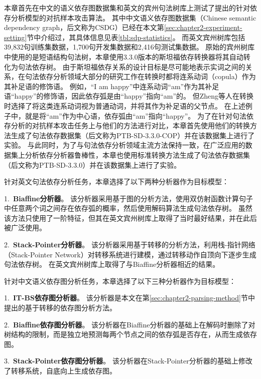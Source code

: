 本章首先在中文的语义依存图数据集和英文的宾州句法树库\cite{marcus-etal-1993-building}上测试了提出的针对依存分析模型的对抗样本攻击算法。
其中中文语义依存图数据集（Chinese semantic dependency graph，后文称为CSDG）已经在本文第\ref{sec:chapter2-experiment-setting}节中介绍过，其具体信息见表\ref{tbl:sdp-statistics}。
而英文宾州树库包括39,832句训练集数据，1,700句开发集数据和2,416句测试集数据。
原始的宾州树库中使用的是短语结构句法树，本章使用3.3.0版本的斯坦福依存转换器\cite{de-etal-2006-generating}将其自动转化为句法依存树。
由于斯坦福依存关系的设计目标是尽可能地表示实词之间的关系，在句法依存分析领域大部分的研究工作在转换时都将连系动词（copula）作为其补足语的修饰语。
例如，“I am happy”中连系动词“am”作为其补足语“happy”的修饰语，因此依存弧是由“happy”指向“am”的。
但Zheng等人\cite{zheng-etal-2020-evaluating}在转换时选择了将这类连系动词视为普通动词，并将其作为补足语的父节点。
在上述例子中，就是将“am”作为中心语，依存弧由“am”指向“happy”。
为了在针对句法依存分析的对抗样本攻击任务上与他们的方法进行对比，本章首先使用他们的转换方法生成了句法依存数据集（后文称为PTB-SD-3.3.0-COP）并在该数据集上进行了实验。
与此同时，为了与句法依存分析领域主流方法保持一致，在广泛应用的数据集上分析依存分析器鲁棒性，本章也使用标准转换方法生成了句法依存数据集（后文称为PTB-SD-3.3.0）并在该数据集上进行了实验。

针对英文句法依存分析任务，本章选择了以下两种分析器作为目标模型：

1.\ \textbf{Biaffine分析器}\cite{dozat-etal-2017-deep}。
该分析器采用基于图的分析方法，使用双仿射函数计算句子中任意两个词之间存在依存弧的概率，然后使用解码算法生成句法依存树。
虽然该方法只使用了一阶特征，但其在英文宾州树库上取得了当时最好结果，并在此后被广泛使用。

2.\ \textbf{Stack-Pointer分析器}\cite{ma-etal-2018-stack}。
该分析器采用基于转移的分析方法，利用栈-指针网络（Stack-Pointer Network）对转移系统进行建模，通过转移动作自顶向下逐步生成句法依存树。
在英文宾州树库上取得了与Biaffine分析器相近的结果。

针对中文语义依存图分析任务，本章选择了以下三种分析器作为目标模型：

1.\ \textbf{IT-BS依存图分析器}。
该分析器是本文在第\ref{sec:chapter2-parsing-method}节中提出的基于转移的依存图分析方法。

2.\ \textbf{Biaffine依存图分析器}\cite{dozat-manning-2018-simpler}。
该分析器在Biaffine分析器的基础上在解码时删除了对树结构的限制，而是独立地预测每两个节点之间的依存弧是否存在，从而生成依存图。

3.\ \textbf{Stack-Pointer依存图分析器}\cite{fernandez-etal-2020-transition}。
该分析器在Stack-Pointer分析器的基础上修改了转移系统，自底向上生成依存图。

